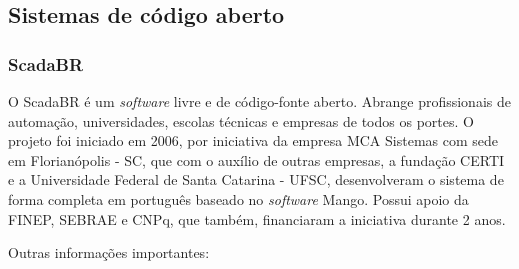 \subsection{Sistemas de código aberto}
\label{sec:scadaweb}

\subsubsection{ScadaBR}
\label{sec:scadabr}

    O ScadaBR \cite{ScadaBR} é um \textit{software} livre e de código-fonte aberto. Abrange profissionais de automação, universidades, escolas técnicas e empresas de todos os portes. O projeto foi iniciado em 2006, por iniciativa da empresa MCA Sistemas com sede em Florianópolis - SC, que com o auxílio de outras empresas, a fundação CERTI e a Universidade Federal de Santa Catarina - UFSC, desenvolveram o sistema de forma completa em português baseado no \textit{software} Mango. Possui apoio da FINEP, SEBRAE e CNPq, que também, financiaram a iniciativa durante 2 anos.

    \begin{figure}[!h]
    \end{figure}
    
    Outras informações importantes:
    
